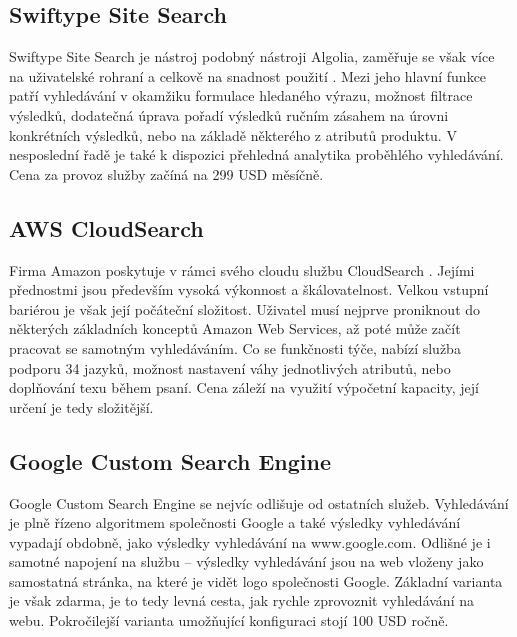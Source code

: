 \documentclass[FM,DP]{tulthesis}
\begin{document}
\subsection{Swiftype Site Search}

Swiftype Site Search je nástroj podobný nástroji Algolia, zaměřuje se však více na 
uživatelské rohraní a celkově na snadnost použití \cite{swiftype}. Mezi jeho hlavní
funkce patří vyhledávání v okamžiku formulace hledaného výrazu, možnost filtrace
výsledků, dodatečná úprava pořadí výsledků ručním zásahem na úrovni konkrétních 
výsledků, nebo na základě některého z atributů produktu. V nesposlední řadě je také
k dispozici přehledná analytika proběhlého vyhledávání. Cena za provoz služby
začíná na 299 USD měsíčně.

\subsection{AWS CloudSearch}

Firma Amazon poskytuje v rámci svého cloudu službu CloudSearch \cite{cloud-search}.
Jejími přednostmi jsou především vysoká výkonnost a škálovatelnost. Velkou vstupní
bariérou je však její počáteční složitost. Uživatel musí nejprve proniknout do 
některých základních konceptů Amazon Web Services, až poté může začít pracovat
se samotným vyhledáváním. Co se funkčnosti týče, nabízí služba podporu 34 jazyků, 
možnost nastavení váhy jednotlivých atributů, nebo doplňování texu během psaní.
Cena záleží na využití výpočetní kapacity, její určení je tedy složitější.

\subsection{Google Custom Search Engine}

Google Custom Search Engine \cite{gse} se nejvíc odlišuje od ostatních služeb. 
Vyhledávání je plně řízeno algoritmem společnosti Google a také výsledky vyhledávání
vypadají obdobně, jako výsledky vyhledávání na www.google.com. 
Odlišné je i samotné napojení na službu -- výsledky vyhledávání jsou na web
vloženy jako samostatná stránka, na které je vidět logo společnosti Google.
Základní varianta je však zdarma, je to tedy levná cesta, jak rychle zprovoznit
vyhledávání na webu. Pokročilejší varianta umožňující konfiguraci stojí 100 USD ročně.

%
%
\end{document}
